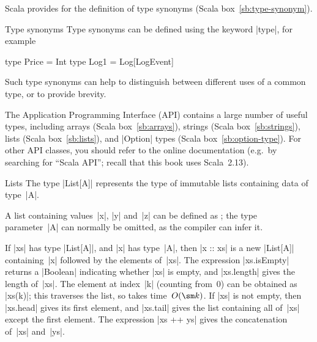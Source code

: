 
\pagebreak[3]

Scala provides for the definition of type synonyms (Scala
box~\ref{sb:type-synonym}). 

\begin{scalaBox}{Type synonyms}
\label{sb:type-synonym}
Type synonyms can be defined using the keyword |type|, for example
\begin{scala}
  type Price = Int
  type Log1 = Log[LogEvent]
\end{scala}
Such type synonyms can help to distinguish between different uses of a common
type, or to provide brevity. 
\end{scalaBox}

\pagebreak[3]

The Application Programming Interface (API) contains a large number of useful
types, including arrays (Scala box~\ref{sb:arrays}), strings (Scala
box~\ref{sb:strings}), lists (Scala box~\ref{sb:lists}), and |Option| types
(Scala box~\ref{sb:option-type}).  For other API classes, you should refer to
the online documentation (e.g.~by searching for ``Scala
API''; recall that this book uses Scala~2.13).


\begin{scalaBox}{Lists}
\label{sb:lists}
The type |List[A]| represents the type of immutable lists containing data of
type~|A|.

A list containing values~|x|, |y| and~|z| can be defined as ; the type parameter~|A| can normally be omitted, as the compiler can
infer it.

If |xs| has type |List[A]|, and |x| has type~|A|, then |x :: xs| is a new
|List[A]| containing~|x| followed by the elements of~|xs|.  The expression
|xs.isEmpty| returns a |Boolean| indicating whether |xs| is empty, and
|xs.length| gives the length of~|xs|.  The element at index~|k| (counting
from~0) can be obtained as |xs(k)|; this traverses the list, so takes
time~$O(\sm k)$.  If |xs| is not empty, then |xs.head| gives its first
element, and |xs.tail| gives the list containing all of~|xs| except the first
element.  The expression |xs ++ ys| gives the concatenation of~|xs| and~|ys|. 
\end{scalaBox}


